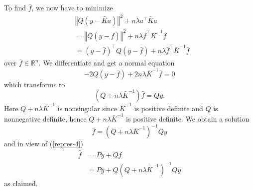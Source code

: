 \documentclass[11pt,twoside]{article}%
\theoremstyle{change}
\newenvironment{quote-env}{\begin{quote}\sffamily }{\end{quote}}
\newenvironment{mycomments-env}[1][Mycomments]{\textbf{#1.} \begin{quote-env} }{ \end{quote-env}  \ \rule{0.5em}{0.5em}}
\begin{document}
\begin{mycomments}
\begin{mycomments-env}
To find $\bar{f}$, we now have to minimize
\begin{align*}
& \left\Vert Q\left(  y-\bar{K}a\right)  \right\Vert ^{2}+n\lambda a^{\top
}\bar{K}a\\
& =\left\Vert Q\left(  y-\bar{f}\right)  \right\Vert ^{2}+n\lambda\bar
{f}^{\top}\bar{K}^{-1}\bar{f}\\
& =\left(  y-\bar{f}\right)  ^{\top}Q\left(  y-\bar{f}\right)  +n\lambda
\bar{f}^{\top}\bar{K}^{-1}\bar{f}%
\end{align*}
over $\bar{f}\in\mathbb{R}^{n}$. We differentiate and get a normal equation
\[
-2Q\left(  y-\bar{f}\right)  +2n\lambda\bar{K}^{-1}\bar{f}=0
\]
which transforms to
\[
\left(  Q+n\lambda\bar{K}^{-1}\right)  \bar{f}=Qy.
\]
Here $Q+n\lambda\bar{K}^{-1}$ is nonsingular since $\bar{K}^{-1}$ is positive
definite and $Q$ is nonnegative definite, hence $Q+n\lambda\bar{K}^{-1}$ is
positive definite. We obtain a solution
\[
\bar{f}=\left(  Q+n\lambda\bar{K}^{-1}\right)  ^{-1}Qy
\]
and in view of (\ref{repres-4})
\begin{align*}
\hat{f}  & =Py+Q\bar{f}\\
& =Py+Q\left(  Q+n\lambda\bar{K}^{-1}\right)  ^{-1}Qy
\end{align*}
as claimed.


\end{mycomments-env}
\end{mycomments}
\end{document}
